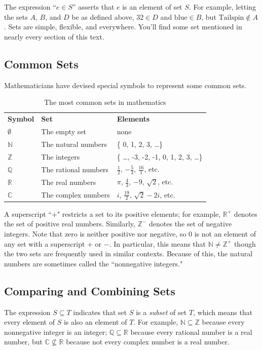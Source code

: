 \documentclass[11pt,oneside]{book}
\theoremstyle{definition}
\begin{document}
The expression ``$e \in S$” asserts that $e$ is an element of set $S$.
For example, letting the sets $A$, $B$, and $D$ be as defined above,
$32 \in D$ and $\text{blue} \in B$, but $\text{Tailspin} \not\in A$.
Sets are simple, flexible, and everywhere.
You'll find some set mentioned in nearly every section of this text.


\subsection{Common Sets}
Mathematicians have devised special symbols to represent some common sets.

\begin{table}[H]
\centering
\begin{tabular}[t]{lll}
    \textbf{Symbol} & \textbf{Set} & \textbf{Elements} \\
    $\emptyset$ & The empty set & none \\
    $\mathbb{N}$ & The natural numbers & \{ 0, 1, 2, 3, \dots \} \\
    $\mathbb{Z}$ & The integers & \{ \dots, -3, -2, -1, 0, 1, 2, 3, \dots \} \\
    $\mathbb{Q}$ & The rational numbers & $\frac{1}{2}$, $-\frac{5}{3}$, $\frac{16}{1}$, etc. \\
    $\mathbb{R}$ & The real numbers & $\pi$, $\frac{4}{3}$, $-9$, $\sqrt{2}$, etc. \\
    $\mathbb{C}$ & The complex numbers & $i$, $\frac{19}{2}$, $\sqrt{2} - 2i$, etc.
\end{tabular}
\caption{The most common sets in mathematics}
\label{tab:CommonSets}
\end{table}

A superscript ``$+$" restricts a set to its positive elements; for example, $\mathbb{R}^{+}$ denotes
the set of positive real numbers.
Similarly, $\mathbb{Z}^{-}$ denotes the set of negative integers.
Note that zero is neither positive nor negative, so 0 is not an element of any set with a superscript $+$ or $-$.
In particular, this means that $\mathbb{N} \neq \mathbb{Z}^{+}$ though the two sets are frequently used in similar contexts.
Because of this, the natural numbers are sometimes called the ``nonnegative integers."


\subsection{Comparing and Combining Sets}
The expression $S \subseteq T$ indicates that set $S$ is a \emph{subset} of set $T$, which means that every element of $S$ is also an element of $T$.
For example, $\mathbb{N} \subseteq \mathbb{Z}$ because every nonnegative integer is an integer; $\mathbb{Q} \subseteq \mathbb{R}$ because every rational number is a real number, but $\mathbb{C} \not\subseteq \mathbb{R}$ because not every complex number is a real number.
\end{document}
